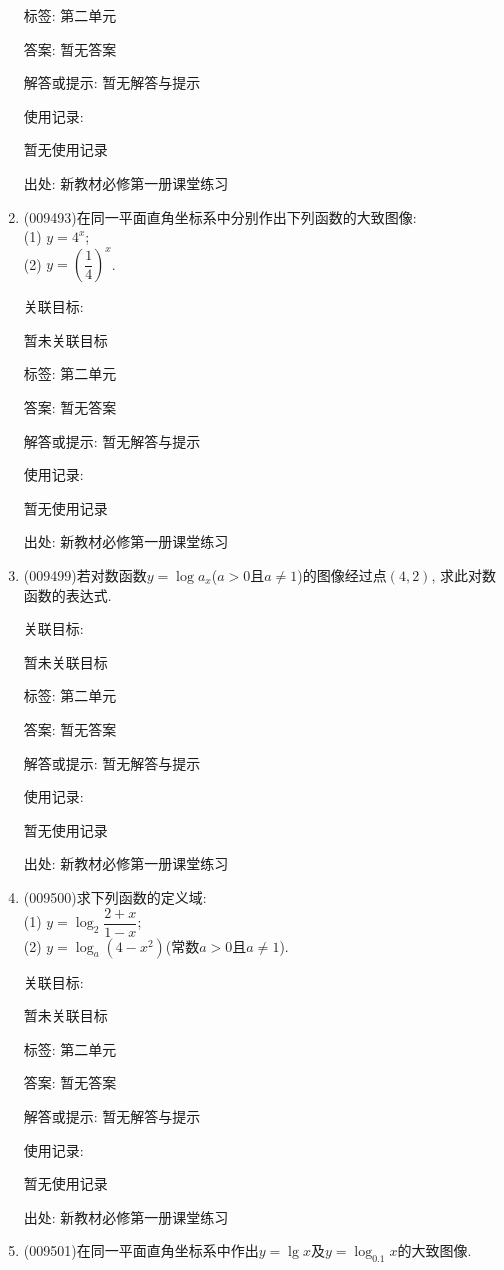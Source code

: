 \documentclass[10pt,a4paper]{article}
\begin{document}
\begin{enumerate}[1.]
标签: 第二单元

答案: 暂无答案

解答或提示: 暂无解答与提示

使用记录:

暂无使用记录


出处: 新教材必修第一册课堂练习
\item { (009493)}在同一平面直角坐标系中分别作出下列函数的大致图像:\\
(1) $y=4^x$;\\
(2) $y=(\dfrac 14)^x$.


关联目标:

暂未关联目标



标签: 第二单元

答案: 暂无答案

解答或提示: 暂无解答与提示

使用记录:

暂无使用记录


出处: 新教材必修第一册课堂练习
\item { (009499)}若对数函数$y=\log a_x$($a>0$且$a\ne 1$)的图像经过点$(4, 2)$, 求此对数函数的表达式.


关联目标:

暂未关联目标



标签: 第二单元

答案: 暂无答案

解答或提示: 暂无解答与提示

使用记录:

暂无使用记录


出处: 新教材必修第一册课堂练习
\item { (009500)}求下列函数的定义域:\\
(1) $y=\log_2\dfrac{2+x}{1-x}$;\\
(2) $y=\log_a(4-x^2)$(常数$a>0$且$a\ne 1$).


关联目标:

暂未关联目标



标签: 第二单元

答案: 暂无答案

解答或提示: 暂无解答与提示

使用记录:

暂无使用记录


出处: 新教材必修第一册课堂练习
\item { (009501)}在同一平面直角坐标系中作出$y=\lg x$及$y=\log_{0.1}x$的大致图像.



\end{enumerate}
\end{document}
